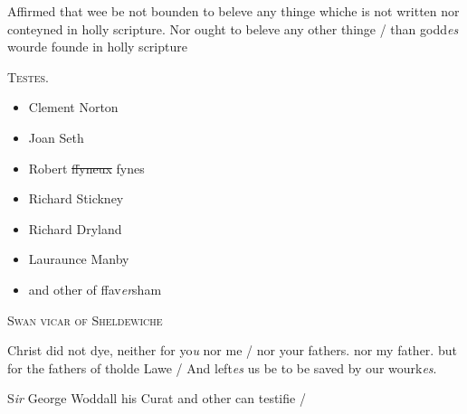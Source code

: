 \documentclass[12pt, a4paper]{book}
\begin{document}
            	
            		
			
            	
		\ifthenelse{\isodd{\thepage}}
		{\reversemarginpar}
		{\normalmarginpar}
		Affirmed that wee be not bounden to beleve
  any thinge whiche is not written nor conteyned
 in holly scripture. Nor ought to beleve any other
 thinge / than godd\textit{es} wourde founde in holly scripture
            	
 
 	\begin{center} {\scshape Testes.} \end{center}\begin{itemize}
 	
 		\item[]Clement Norton
 		\item[]Joan Seth
 		\item[]Robert \sout{ffyneux} fynes
 		\item[]Richard Stickney
 		\item[]Richard Dryland
 		\item[]Lauraunce Manby
 		\item[]and other of ffav\textit{er}sham
 	\end{itemize}
 	
		\ifthenelse{\isodd{\thepage}}
		{\reversemarginpar}
		{\normalmarginpar}
		
 
 

            
               
				\begin{center} \begin{large} {\scshape Swan vicar of Sheldewiche } \end{large} \end{center}
			
 
 	
				\marginpar[\vspace{0.5cm}{\textcolor{Gray}{n}}]{}
			
 	
		\ifthenelse{\isodd{\thepage}}
		{\reversemarginpar}
		{\normalmarginpar}
		Christ did not dye, neither for yo\textit{u} nor me / nor
 your fathers. nor my father. but for the fathers
 of tholde Lawe / And left\textit{es} us be to be saved
 	by our wourk\textit{es}.

		\ifthenelse{\isodd{\thepage}}
		{\reversemarginpar}
		{\normalmarginpar}
		S\textit{ir} George Woddall his Curat and other can
 	testifie /
 
\end{document}
